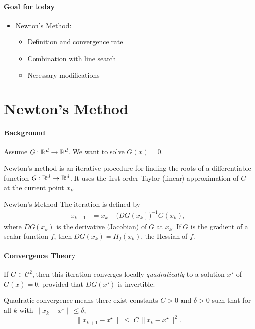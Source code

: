 \paragraph{Goal for today}
\begin{itemize}
    \item Newton's Method:
    \begin{itemize}
        \item Definition and convergence rate
        \item Combination with line search
        \item Necessary modifications
    \end{itemize}
\end{itemize}

\section*{Newton's Method}

\paragraph{Background}
Assume \(G: \mathbb{R}^d \to \mathbb{R}^d\). We want to solve \(G(x) = 0\).

Newton's method is an iterative procedure for finding the roots of a differentiable function \(G: \mathbb{R}^d \to \mathbb{R}^d\). 
It uses the first-order Taylor (linear) approximation of \(G\) at the current point \(x_k\).

\begin{definition}{Newton's Method}{}
    The iteration is defined by
    \begin{align*}
        x_{k+1} &= x_k - \bigl(D G(x_k)\bigr)^{-1} G(x_k),
    \end{align*}
    where \(D G(x_k)\) is the derivative (Jacobian) of \(G\) at \(x_k\). If \(G\) is the gradient of a scalar function \(f\), then \(DG(x_k) = H_f(x_k)\), the Hessian of \(f\).
\end{definition}

\paragraph{Convergence Theory}
If \(G\in \mathcal{C}^2\), then this iteration converges locally \emph{quadratically} to 
a solution \(x^\star\) of \(G(x) = 0\), provided that \(D G(x^\star)\) is invertible.

\begin{remark}
    Quadratic convergence means there exist constants \(C>0\) and \(\delta>0\) such that for all \(k\) with \(\|x_k - x^\star\|\le \delta\),
    \[
        \|x_{k+1} - x^\star\| \;\le\; C \,\|x_k - x^\star\|^2.
    \]
\end{remark}

